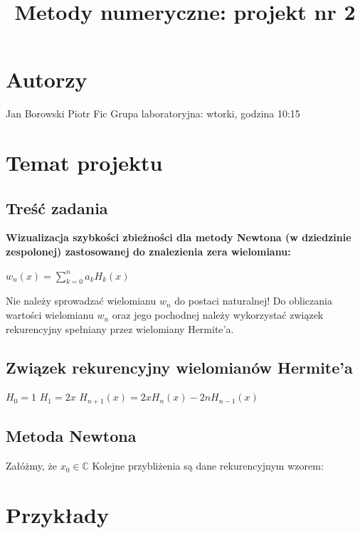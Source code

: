 \documentclass[10pt]{article}   %
\begin{document}
\title{Metody numeryczne: projekt nr 2}
\maketitle

\tableofcontents

\section{Autorzy}
Jan Borowski\newline
Piotr Fic\newline
Grupa laboratoryjna: wtorki, godzina 10:15
\newpage
\section{Temat projektu}

\subsection{Treść zadania}
\begin{center}
\textbf{Wizualizacja szybkości zbieżności dla metody Newtona (w dziedzinie zespolonej) zastosowanej do znalezienia zera wielomianu:}\newline

$w_{n}(x)={\sum}_{k=0}^{n}a_{k}H_{k}(x)$

\end{center}
Nie należy sprowadzać wielomianu $w_{n}$ do postaci naturalnej! Do obliczania wartości wielomianu $w_{n}$ oraz jego pochodnej należy wykorzystać związek rekurencyjny spełniany przez wielomiany Hermite'a.

\subsection{Związek rekurencyjny wielomianów Hermite'a}

$H_{0}=1$\newline
$H_{1}=2x$\newline
$H_{n+1}(x)=2xH_{n}(x)-2nH_{n-1}(x)$

\subsection{Metoda Newtona}
Załóżmy, że $x_{0} \in\mathbb{C}$
Kolejne przybliżenia są dane rekurencyjnym wzorem:

\newpage
\section{Przykłady}
\end{document}

